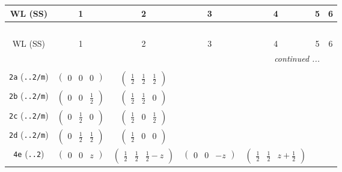 \documentclass[fleqn,9pt,landscape]{jsarticle}
\begin{document}
\begin{center}
\renewcommand{\arraystretch}{1.2}
\begin{longtable}{ccccccc}
 \hline \hline
WL (SS) & 1 & 2 & 3 & 4 & 5 & 6 \\ \hline \endfirsthead

\multicolumn{6}{l}{\tablename\ \thetable{}} \\
 \hline \hline
WL (SS) & 1 & 2 & 3 & 4 & 5 & 6 \\ \hline \endhead

 \hline \hline
\multicolumn{6}{r}{\footnotesize\it continued ...} \\ \endfoot

 \hline \hline
\multicolumn{6}{r}{} \\ \endlastfoot

{\tt 2a} ({\tt ..2/m}) & $ \begin{pmatrix} 0 & 0 & 0 \end{pmatrix} $ & $ \begin{pmatrix} \frac{1}{2} & \frac{1}{2} & \frac{1}{2} \end{pmatrix} $ & $  $ & $  $ & $  $ & $  $ \\ \hline
{\tt 2b} ({\tt ..2/m}) & $ \begin{pmatrix} 0 & 0 & \frac{1}{2} \end{pmatrix} $ & $ \begin{pmatrix} \frac{1}{2} & \frac{1}{2} & 0 \end{pmatrix} $ & $  $ & $  $ & $  $ & $  $ \\ \hline
{\tt 2c} ({\tt ..2/m}) & $ \begin{pmatrix} 0 & \frac{1}{2} & 0 \end{pmatrix} $ & $ \begin{pmatrix} \frac{1}{2} & 0 & \frac{1}{2} \end{pmatrix} $ & $  $ & $  $ & $  $ & $  $ \\ \hline
{\tt 2d} ({\tt ..2/m}) & $ \begin{pmatrix} 0 & \frac{1}{2} & \frac{1}{2} \end{pmatrix} $ & $ \begin{pmatrix} \frac{1}{2} & 0 & 0 \end{pmatrix} $ & $  $ & $  $ & $  $ & $  $ \\ \hline
{\tt 4e} ({\tt ..2}) & $ \begin{pmatrix} 0 & 0 & z \end{pmatrix} $ & $ \begin{pmatrix} \frac{1}{2} & \frac{1}{2} & \frac{1}{2} - z \end{pmatrix} $ & $ \begin{pmatrix} 0 & 0 & - z \end{pmatrix} $ & $ \begin{pmatrix} \frac{1}{2} & \frac{1}{2} & z + \frac{1}{2} \end{pmatrix} $ & $  $ & $  $ \\ \hline

\end{longtable}
\end{center}
\end{document}
